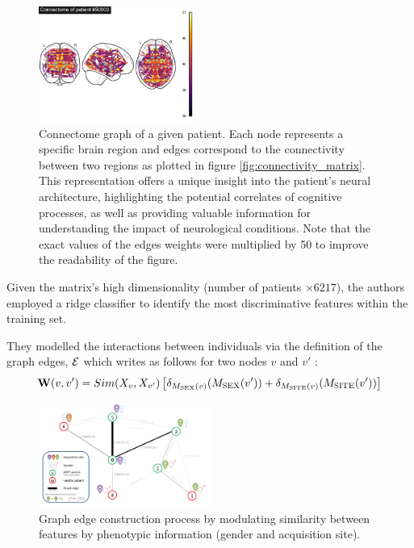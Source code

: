 \begin{figure}[h!]
    \centering
    \includegraphics[width=0.45\textwidth]{figures/ex_connectivity_pitt_ASD.png}
    \caption{Connectome graph of a given patient. Each node represents a specific brain region and edges correspond to the connectivity between two regions as plotted in figure \ref{fig:connectivity_matrix}. This representation offers a unique insight into the patient's neural architecture, highlighting the potential correlates of cognitive processes, as well as providing valuable information for understanding the impact of neurological conditions. Note that the exact values of the edges weights were multiplied by 50 to improve the readability of the figure.}
    \Description{}
    \label{fig:connectome}
\end{figure}

Given the matrix's high dimensionality (number of patients $\times 6217$), the authors employed a ridge classifier to identify the most discriminative features within the training set.

They modelled the interactions between individuals via the definition of the graph edges, $\mathcal{E}$ which writes as follows for two nodes $v$ and $v'$ :
$$ 
    \mathbf{W}(v, v') = Sim(X_v, X_{v'}) \left[\delta_{M_{\text{SEX}}(v)}(M_{\text{SEX}}(v')) + \delta_{M_{\text{SITE}}(v)}(M_{\text{SITE}}(v')) \right]
$$

\begin{figure}[h]
    \centering
    \includegraphics[width=0.5\textwidth]{figures/spectral_graph_convolution_graph_construction.png}
    \caption{Graph edge construction process by modulating similarity between features by phenotypic information (gender and acquisition site).}
    \Description{}
    \label{fig:graph_construction}
\end{figure}

